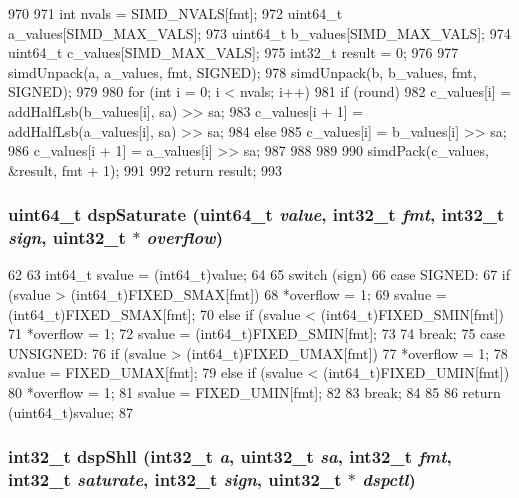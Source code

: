 \begin{DoxyCode}
970 {
971     int nvals = SIMD_NVALS[fmt];
972     uint64_t a_values[SIMD_MAX_VALS];
973     uint64_t b_values[SIMD_MAX_VALS];
974     uint64_t c_values[SIMD_MAX_VALS];
975     int32_t result = 0;
976 
977     simdUnpack(a, a_values, fmt, SIGNED);
978     simdUnpack(b, b_values, fmt, SIGNED);
979 
980     for (int i = 0; i < nvals; i++) {
981         if (round) {
982             c_values[i] = addHalfLsb(b_values[i], sa) >> sa;
983             c_values[i + 1] = addHalfLsb(a_values[i], sa) >> sa;
984         } else {
985             c_values[i] = b_values[i] >> sa;
986             c_values[i + 1] = a_values[i] >> sa;
987         }
988     }
989 
990     simdPack(c_values, &result, fmt + 1);
991 
992     return result;
993 }
\end{DoxyCode}
\hypertarget{namespaceMipsISA_a6853d9869c3a54c5a5cd34594ecf1f30}{
\subsubsection[{dspSaturate}]{\setlength{\rightskip}{0pt plus 5cm}uint64\_\-t dspSaturate (uint64\_\-t {\em value}, \/  int32\_\-t {\em fmt}, \/  int32\_\-t {\em sign}, \/  {\bf uint32\_\-t} $\ast$ {\em overflow})}}
\label{namespaceMipsISA_a6853d9869c3a54c5a5cd34594ecf1f30}



\begin{DoxyCode}
62 {
63     int64_t svalue = (int64_t)value;
64 
65     switch (sign) {
66       case SIGNED:
67         if (svalue > (int64_t)FIXED_SMAX[fmt]) {
68             *overflow = 1;
69             svalue = (int64_t)FIXED_SMAX[fmt];
70         } else if (svalue < (int64_t)FIXED_SMIN[fmt]) {
71             *overflow = 1;
72             svalue = (int64_t)FIXED_SMIN[fmt];
73         }
74         break;
75       case UNSIGNED:
76         if (svalue > (int64_t)FIXED_UMAX[fmt]) {
77             *overflow = 1;
78             svalue = FIXED_UMAX[fmt];
79         } else if (svalue < (int64_t)FIXED_UMIN[fmt]) {
80             *overflow = 1;
81             svalue = FIXED_UMIN[fmt];
82         }
83         break;
84     }
85 
86     return (uint64_t)svalue;
87 }
\end{DoxyCode}
\hypertarget{namespaceMipsISA_a68ada9e81042546a67dd29c6a65ce5c3}{
\subsubsection[{dspShll}]{\setlength{\rightskip}{0pt plus 5cm}int32\_\-t dspShll (int32\_\-t {\em a}, \/  {\bf uint32\_\-t} {\em sa}, \/  int32\_\-t {\em fmt}, \/  int32\_\-t {\em saturate}, \/  int32\_\-t {\em sign}, \/  {\bf uint32\_\-t} $\ast$ {\em dspctl})}}
\label{namespaceMipsISA_a68ada9e81042546a67dd29c6a65ce5c3}



